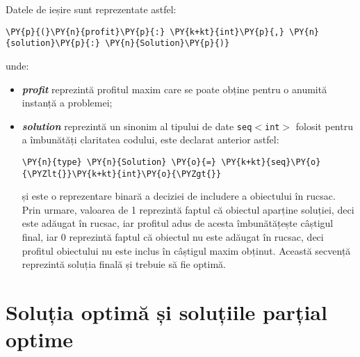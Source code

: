 \begin{sloppypar}
Datele de ieșire sunt reprezentate astfel:
\begin{Verbatim}[commandchars=\\\{\}]
                \PY{p}{(}\PY{n}{profit}\PY{p}{:} \PY{k+kt}{int}\PY{p}{,} \PY{n}{solution}\PY{p}{:} \PY{n}{Solution}\PY{p}{)}
\end{Verbatim}
unde:
\begin{itemize}
    \item \textit{\textbf{\textcolor{coleight}{profit}}} reprezintă profitul maxim care se poate obține pentru o anumită instanță a problemei;
    \item \textit{\textbf{\textcolor{coleight}{solution}}} reprezintă un sinonim al tipului de date \texttt{seq\(<\)int\(>\)} folosit pentru a îmbunătăți claritatea codului, este declarat anterior astfel:
\begin{Verbatim}[commandchars=\\\{\}]
                \PY{n}{type} \PY{n}{Solution} \PY{o}{=} \PY{k+kt}{seq}\PY{o}{\PYZlt{}}\PY{k+kt}{int}\PY{o}{\PYZgt{}}
\end{Verbatim}
și este o reprezentare binară a deciziei de includere a obiectului în rucsac. Prin urmare, valoarea de 1 reprezintă faptul că obiectul aparține soluției, deci este adăugat în rucsac, iar profitul adus de acesta îmbunătățește câștigul final, iar 0 reprezintă faptul că obiectul nu este adăugat în rucsac, deci profitul obiectului nu este inclus în câștigul maxim obținut. Această secvență reprezintă soluția finală și trebuie să fie optimă.
\end{itemize} 

\end{sloppypar}

\section{Soluția optimă și soluțiile parțial optime}

